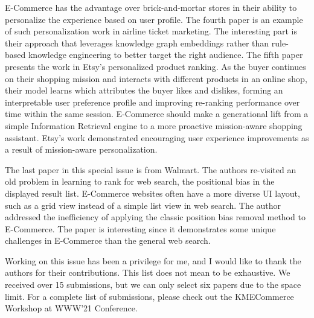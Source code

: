 \documentclass[11pt]{article}
\begin{document}
E-Commerce has the advantage over brick-and-mortar stores in their ability to personalize the experience based on user profile. The fourth paper is an example of such personalization work in airline ticket marketing. The interesting part is their approach that leverages knowledge graph embeddings rather than rule-based knowledge engineering to better target the right audience. The fifth paper presents the work in Etsy's personalized product ranking. As the buyer continues on their shopping mission and interacts with different products in an online shop, their model learns which attributes the buyer likes and dislikes, forming an interpretable user preference profile and improving re-ranking performance over time within the same session. E-Commerce should make a generational lift from a simple Information Retrieval engine to a more proactive mission-aware shopping assistant. Etsy's work demonstrated encouraging user experience improvements as a result of mission-aware personalization. 


The last paper in this special issue is from Walmart. The authors re-visited an old problem in learning to rank for web search, the positional bias in the displayed result list. E-Commerce websites often have a more diverse UI layout, such as a grid view instead of a simple list view in web search. The author addressed the inefficiency of applying the classic position bias removal method to E-Commerce. The paper is interesting since it demonstrates some unique challenges in E-Commerce than the general web search.

Working on this issue has been a privilege for me, and I would like to thank the authors for their contributions. This list does not mean to be exhaustive. We received over 15 submissions, but we can only select six papers due to the space limit. For a complete list of submissions, please check out the KMECommerce Workshop at WWW'21 Conference.
\end{document}

